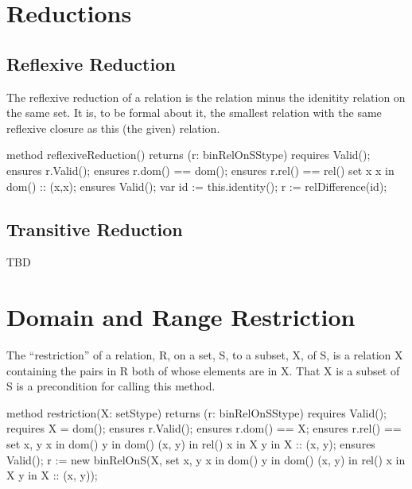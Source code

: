 \documentclass[letterpaper,10pt,english]{sphinxmanual}
\begin{document}
\section{Reductions}
\label{\detokenize{08-relations:reductions}}

\subsection{Reflexive Reduction}
\label{\detokenize{08-relations:reflexive-reduction}}
The reflexive reduction of a relation is the relation
minus the idenitity relation on the same set. It is, to
be formal about it, the smallest relation with the same
reflexive closure as this (the given) relation.

\begin{sphinxVerbatim}[commandchars=\\\{\}]
method reflexiveReduction() returns (r: binRelOnS\PYGZlt{}Stype\PYGZgt{})
    requires Valid();
    ensures r.Valid();
    ensures r.dom() == dom();
    ensures r.rel() == rel() \PYGZhy{}  set x \textbar{} x in dom() :: (x,x);
    ensures Valid();
\PYGZob{}
    var id := this.identity();
    r := relDifference(id);
\PYGZcb{}
\end{sphinxVerbatim}


\subsection{Transitive Reduction}
\label{\detokenize{08-relations:transitive-reduction}}
TBD


\section{Domain and Range Restriction}
\label{\detokenize{08-relations:domain-and-range-restriction}}
The “restriction” of a relation, R, on a set, S, to a subset, X, of S,
is a relation X containing the pairs in R both of whose elements are
in X. That X is a subset of S is a precondition for calling this
method.

\begin{sphinxVerbatim}[commandchars=\\\{\}]
method restriction(X: set\PYGZlt{}Stype\PYGZgt{}) returns (r: binRelOnS\PYGZlt{}Stype\PYGZgt{})
    requires Valid();
    requires X \PYGZlt{}= dom();
    ensures r.Valid();
    ensures r.dom() == X;
    ensures r.rel() == set x, y \textbar{} x in dom() \PYGZam{}\PYGZam{} y in dom() \PYGZam{}\PYGZam{}
        (x, y) in rel() \PYGZam{}\PYGZam{} x in X \PYGZam{}\PYGZam{} y in X :: (x, y);
    ensures Valid();
\PYGZob{}
    r := new binRelOnS(X, set x, y \textbar{} x in dom() \PYGZam{}\PYGZam{} y in dom() \PYGZam{}\PYGZam{}
        (x, y) in rel() \PYGZam{}\PYGZam{} x in X \PYGZam{}\PYGZam{} y in X :: (x, y));
\PYGZcb{}
\end{sphinxVerbatim}
\end{document}
